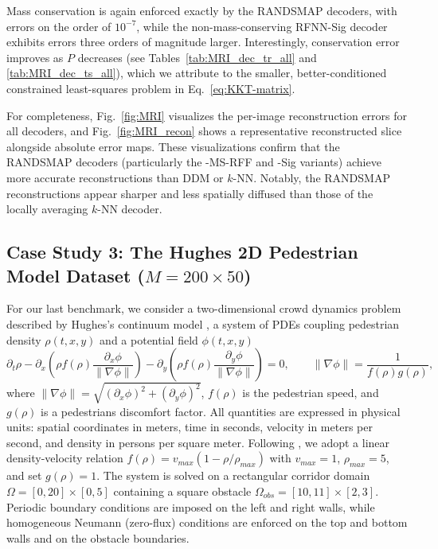 \documentclass{article}
\begin{document}
Mass conservation is again enforced exactly by the RANDSMAP decoders, with errors on the order of $10^{-7}$, while the non-mass-conserving RFNN-Sig decoder exhibits errors three orders of magnitude larger. Interestingly, conservation error improves as $P$ decreases (see Tables~\ref{tab:MRI_dec_tr_all} and \ref{tab:MRI_dec_ts_all}), which we attribute to the smaller, better-conditioned constrained least-squares problem in Eq.~\eqref{eq:KKT-matrix}.
 
For completeness, Fig.~\ref{fig:MRI} visualizes the per-image reconstruction errors for all decoders, and Fig.~\ref{fig:MRI_recon} shows a representative reconstructed slice alongside absolute error maps. These visualizations confirm that the RANDSMAP decoders (particularly the -MS-RFF and -Sig variants) achieve more accurate reconstructions than DDM or $k$-NN. Notably, the RANDSMAP reconstructions appear sharper and less spatially diffused than those of the locally averaging $k$-NN decoder.
\subsection{Case Study 3: The Hughes 2D Pedestrian Model Dataset (\texorpdfstring{$M=200\times50$}{M=200 x 50})} \label{sb:Hughes}
For our last benchmark, we consider a two-dimensional crowd dynamics problem described by Hughes's continuum model \cite{hughes2002continuum}, a system of PDEs coupling pedestrian density $\rho(t,x,y)$ and a potential field $\phi(t,x,y)$
\begin{equation}
    \partial_t \rho - \partial_x\left( \rho f(\rho) \dfrac{\partial_x\phi}{\|\nabla\phi\|}\right) - \partial_y\left( \rho f(\rho) \dfrac{\partial_y\phi}{\|\nabla\phi\|}\right) = 0, \qquad 
    \|\nabla\phi\| %
    =\dfrac{1}{f(\rho)g(\rho)}, 
\end{equation}
where $\|\nabla\phi\|=\sqrt{(\partial_x\phi)^2 + (\partial_y\phi)^2}$, $f(\rho)$ is the pedestrian speed, and $g(\rho)$ is a pedestrians discomfort factor. All quantities are expressed in physical units: spatial coordinates in meters, time in seconds, velocity in meters per second, and density in persons per square meter. Following \cite{viola2025pde}, we adopt a linear density-velocity relation $f(\rho)=v_{max}(1-\rho/\rho_{max})$ with $v_{max}=1$, $\rho_{max}=5$, and set $g(\rho)=1$. The system is solved on a rectangular corridor domain $\Omega = [0,20]\times[0,5]$ containing a square obstacle $\Omega_{obs}=[10,11]\times[2,3]$. Periodic boundary conditions are imposed on the left and right walls, while homogeneous Neumann (zero-flux) conditions are enforced on the top and bottom walls and on the obstacle boundaries.
\end{document}
